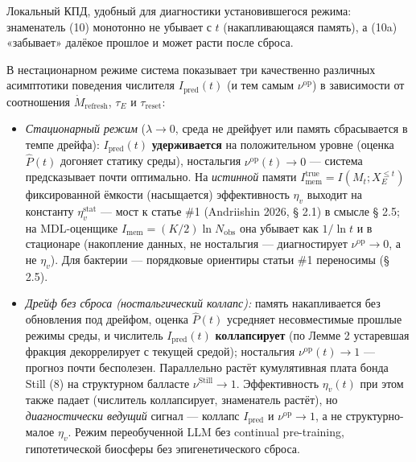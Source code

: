 \documentclass[pdflatex,sn-mathphys-ay]{sn-jnl}
\providecommand{\tightlist}{\setlength{\itemsep}{0pt}\setlength{\parskip}{0pt}}
\begin{document}
Локальный КПД, удобный для диагностики установившегося режима: знаменатель (10) монотонно не убывает с \(t\) (накапливающаяся память), а (10a) «забывает» далёкое прошлое и может расти после сброса.



В нестационарном режиме система показывает три качественно различных асимптотики поведения числителя \(I_{\text{pred}}(t)\) (и тем самым \(\nu^{\text{op}}\)) в зависимости от соотношения \(\dot M_{\text{refresh}}\), \(\tau_E\) и \(\tau_{\text{reset}}\):



\begin{itemize}

\tightlist

\item

  \emph{Стационарный режим} (\(\lambda \to 0\), среда не дрейфует или память сбрасывается в темпе дрейфа): \(I_{\text{pred}}(t)\) \textbf{удерживается} на положительном уровне (оценка \(\hat P(t)\) догоняет статику среды), ностальгия \(\nu^{\text{op}}(t) \to 0\) --- система предсказывает почти оптимально. На \emph{истинной} памяти \(I_{\text{mem}}^{\text{true}} = I(M_t; X_E^{\le t})\) фиксированной ёмкости (насыщается) эффективность \(\eta_v\) выходит на константу \(\eta_v^{\text{stat}}\) --- мост к статье \#1 (Andriishin 2026, § 2.1) в смысле § 2.5; на MDL-оценщике \(I_{\text{mem}} = (K/2)\ln N_{\text{obs}}\) она убывает как \(1/\ln t\) и в стационаре (накопление данных, не ностальгия --- диагностирует \(\nu^{\text{op}} \to 0\), а не \(\eta_v\)). Для бактерии --- порядковые ориентиры статьи \#1 переносимы (§ 2.5).

\item

  \emph{Дрейф без сброса (ностальгический коллапс):} память накапливается без обновления под дрейфом, оценка \(\hat P(t)\) усредняет несовместимые прошлые режимы среды, и числитель \(I_{\text{pred}}(t)\) \textbf{коллапсирует} (по Лемме 2 устаревшая фракция декоррелирует с текущей средой); ностальгия \(\nu^{\text{op}}(t) \to 1\) --- прогноз почти бесполезен. Параллельно растёт кумулятивная плата бонда Still (8) на структурном балласте \(\nu^{\text{Still}} \to 1\). Эффективность \(\eta_v(t)\) при этом также падает (числитель коллапсирует, знаменатель растёт), но \emph{диагностически ведущий} сигнал --- коллапс \(I_{\text{pred}}\) и \(\nu^{\text{op}} \to 1\), а не структурно-малое \(\eta_v\). Режим переобученной LLM без continual pre-training, гипотетической биосферы без эпигенетического сброса.


\end{itemize}
\end{document}
